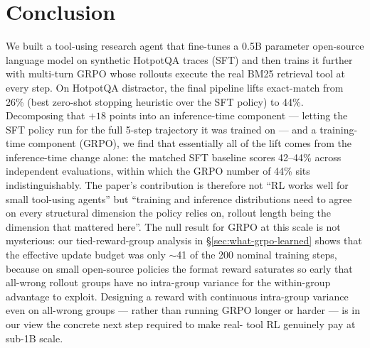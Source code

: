 \documentclass[11pt]{article}
\begin{document}
\section{Conclusion}
\label{sec:conclusion}

We built a tool-using research agent that fine-tunes a 0.5B
parameter open-source language model on synthetic HotpotQA traces
(SFT) and then trains it further with multi-turn GRPO whose
rollouts execute the real BM25 retrieval tool at every step. On
HotpotQA distractor, the final pipeline lifts exact-match from
26\% (best zero-shot stopping heuristic over the SFT policy) to
44\%. Decomposing that $+18$ points into an inference-time
component --- letting the SFT policy run for the full 5-step
trajectory it was trained on --- and a training-time component
(GRPO), we find that essentially all of the lift comes from the
inference-time change alone: the matched SFT baseline scores
42--44\% across independent evaluations, within which the GRPO
number of 44\% sits indistinguishably. The paper's contribution
is therefore not ``RL works well for small tool-using agents''
but ``training and inference distributions need to agree on
every structural dimension the policy relies on, rollout length
being the dimension that mattered here''. The null result for
GRPO at this scale is not mysterious: our tied-reward-group
analysis in §\ref{sec:what-grpo-learned} shows that the
effective update budget was only $\sim$41 of the 200 nominal
training steps, because on small open-source policies the format
reward saturates so early that all-wrong rollout groups have no
intra-group variance for the within-group advantage to exploit.
Designing a reward with continuous intra-group variance even on
all-wrong groups --- rather than running GRPO longer or harder
--- is in our view the concrete next step required to make real-
tool RL genuinely pay at sub-1B scale.



\end{document}
